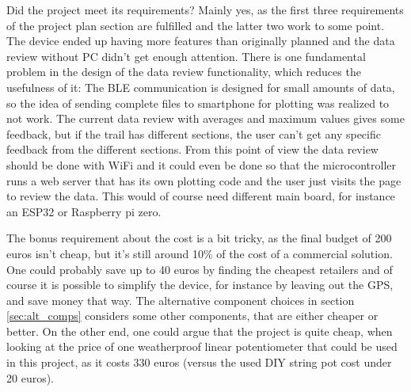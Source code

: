 \documentclass[a4paper,11pt]{article}
\begin{document}
Did the project meet its requirements? Mainly yes, as the first three requirements of the project plan section are fulfilled and the latter two work to some point. The device ended up having more features than originally planned and the data review without PC didn't get enough attention. There is one fundamental problem in the design of the data review functionality, which reduces the usefulness of it: The BLE communication is designed for small amounts of data, so the idea of sending complete files to smartphone for plotting was realized to not work. The current data review with averages and maximum values gives some feedback, but if the trail has different sections, the user can't get any specific feedback from the different sections. From this point of view the data review should be done with WiFi and it could even be done so that the microcontroller runs a web server that has its own plotting code and the user just visits the page to review the data. This would of course need different main board, for instance an ESP32 or Raspberry pi zero.

The bonus requirement about the cost is a bit tricky, as the final budget of 200 euros isn't cheap, but it's still around 10\% of the cost of a commercial solution. One could probably save up to 40 euros by finding the cheapest retailers and of course it is possible to simplify the device, for instance by leaving out the GPS, and save money that way. The alternative component choices in section \ref{sec:alt_comps} considers some other components, that are either cheaper or better. On the other end, one could argue that the project is quite cheap, when looking at the price of one weatherproof linear potentiometer that could be used in this project, as it costs 330 euros (versus the used DIY string pot cost under 20 euros).
\end{document}
